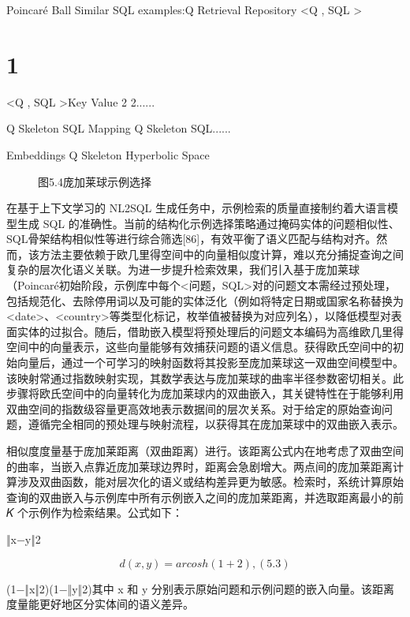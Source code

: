 \documentclass[12pt,a4paper,openright,UTF8]{ctexbook}
\begin{document}
Poincaré Ball Similar SQL examples:Q Retrieval Repository <Q , SQL >

\chapter{1}

<Q , SQL >Key Value 2 2......


Q Skeleton SQL Mapping Q Skeleton SQL......


Embeddings Q Skeleton Hyperbolic Space

\begin{figure}[htbp]
\centering
{}
\caption{图5.4庞加莱球示例选择}
\end{figure}

在基于上下文学习的 NL2SQL 生成任务中，示例检索的质量直接制约着大语言模型生成 SQL 的准确性。当前的结构化示例选择策略通过掩码实体的问题相似性、SQL骨架结构相似性等进行综合筛选[86]，有效平衡了语义匹配与结构对齐。然而，该方法主要依赖于欧几里得空间中的向量相似度计算，难以充分捕捉查询之间复杂的层次化语义关联。为进一步提升检索效果，我们引入基于庞加莱球（Poincaré初始阶段，示例库中每个<问题，SQL>对的问题文本需经过预处理，包括规范化、去除停用词以及可能的实体泛化（例如将特定日期或国家名称替换为 <date>、<country>等类型化标记，枚举值被替换为对应列名），以降低模型对表面实体的过拟合。随后，借助嵌入模型将预处理后的问题文本编码为高维欧几里得空间中的向量表示，这些向量能够有效捕获问题的语义信息。获得欧氏空间中的初始向量后，通过一个可学习的映射函数将其投影至庞加莱球这一双曲空间模型中。该映射常通过指数映射实现，其数学表达与庞加莱球的曲率半径参数密切相关。此步骤将欧氏空间中的向量转化为庞加莱球内的双曲嵌入，其关键特性在于能够利用双曲空间的指数级容量更高效地表示数据间的层次关系。对于给定的原始查询问题，遵循完全相同的预处理与映射流程，以获得其在庞加莱球中的双曲嵌入表示。


相似度度量基于庞加莱距离（双曲距离）进行。该距离公式内在地考虑了双曲空间的曲率，当嵌入点靠近庞加莱球边界时，距离会急剧增大。两点间的庞加莱距离计算涉及双曲函数，能对层次化的语义或结构差异更为敏感。检索时，系统计算原始查询的双曲嵌入与示例库中所有示例嵌入之间的庞加莱距离，并选取距离最小的前𝐾 个示例作为检索结果。公式如下：


‖x−y‖2

\begin{equation}
d(x,y) = arcosh(1+2 ), (5.3)
\end{equation}

(1−‖x‖2)(1−‖y‖2)其中 x 和 y 分别表示原始问题和示例问题的嵌入向量。该距离度量能更好地区分实体间的语义差异。
\end{document}
